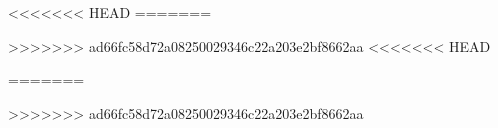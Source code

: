 \usepackage{makeidx}

\usepackage[intoc,spanish]{nomencl}

\usepackage{graphicx} 

\usepackage{subfig}

\usepackage[sort&compress,super,comma, square, sectionbib]{natbib}
\usepackage{chapterbib}

\usepackage{notes2bib}

\usepackage{mciteplus}

\usepackage{cite}

\usepackage{amsmath,amssymb,amsfonts,latexsym}

\usepackage{xkeyval}

\usepackage{enumerate}

\usepackage{lettrine}

\usepackage[format=plain,justification=centerlast,width=15cm,labelsep=period,tablename=Tabla,skip=5pt]{caption}

\usepackage{appendix}

\usepackage[nottoc]{tocbibind}

<<<<<<< HEAD
=======
\usepackage[ref]{backref}

>>>>>>> ad66fc58d72a08250029346c22a203e2bf8662aa
<<<<<<< HEAD
\usepackage[colorlinks=true,linkcolor=red,urlcolor=blue,citecolor=blue,linktoc=all,backref=section]{hyperref}
=======
\usepackage[linktoc=all,backref=section]{hyperref}
\hypersetup{
	colorlinks=true,
	citecolor=violet,
	linkcolor=red,
	urlcolor=blue,
	citebordercolor=violet,
	filebordercolor=red,
	linkbordercolor=blue}
>>>>>>> ad66fc58d72a08250029346c22a203e2bf8662aa

